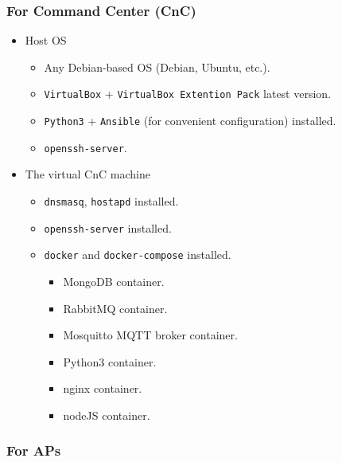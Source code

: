 \subsubsection{For Command Center (CnC)}\label{for-command-center-cnc}

\begin{itemize}
\tightlist
\item
  Host OS

  \begin{itemize}
  \tightlist
  \item
    Any Debian-based OS (Debian, Ubuntu, etc.).
  \item
    \texttt{VirtualBox} + \texttt{VirtualBox\ Extention\ Pack} latest
    version.
  \item
    \texttt{Python3} + \texttt{Ansible} (for convenient configuration) installed.
  \item
    \texttt{openssh-server}.
  \end{itemize}
\item
  The virtual CnC machine

  \begin{itemize}
  \tightlist
  \item
    \texttt{dnsmasq}, \texttt{hostapd} installed.
  \item
    \texttt{openssh-server} installed.
  \item
    \texttt{docker} and \texttt{docker-compose} installed.

    \begin{itemize}
    \tightlist
    \item
      MongoDB container.
    \item
      RabbitMQ container.
    \item
      Mosquitto MQTT broker container.
    \item
      Python3 container.
    \item
      nginx container.
    \item
      nodeJS container.
    \end{itemize}
  \end{itemize}
\end{itemize}

\subsubsection{For APs}\label{for-aps}

